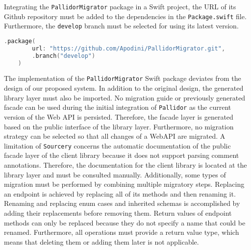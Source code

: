 Integrating the \texttt{PallidorMigrator} package in a Swift project, the URL of its Github repository must be added to the dependencies in the \texttt{Package.swift} file. Furthermore, the \texttt{develop} branch must be selected for using its latest version.

\begin{lstlisting}[language=Swift, caption={Integrating PallidorMigrator in SPM}, captionpos=b, label={lst:IntegrationMigrator}]
	.package(
		url: "https://github.com/Apodini/PallidorMigrator.git", 
		.branch("develop")
	)
\end{lstlisting}

The implementation of the \texttt{PallidorMigrator} Swift package deviates from the design of our proposed system. In addition to the original design, the generated library layer must also be imported. No migration guide or previously generated facade can be used during the initial integration of \texttt{Pallidor} as the current version of the Web API is persisted. Therefore, the facade layer is generated based on the public interface of the library layer. Furthermore, no migration strategy can be selected so that all changes of a WebAPI are migrated. A limitation of \texttt{Sourcery} concerns the automatic documentation of the public facade layer of the client library because it does not support parsing comment annotations. Therefore, the documentation for the client library is located at the library layer and must be consulted manually. Additionally, some types of migration must be performed by combining multiple migratory steps. Replacing an endpoint is achieved by replacing all of its methods and then renaming it. Renaming and replacing enum cases and inherited schemas is accomplished by adding their replacements before removing them. Return values of endpoint methods can only be replaced because they do not specify a name that could be renamed. Furthermore, all operations must provide a return value type, which means that deleting them or adding them later is not applicable.